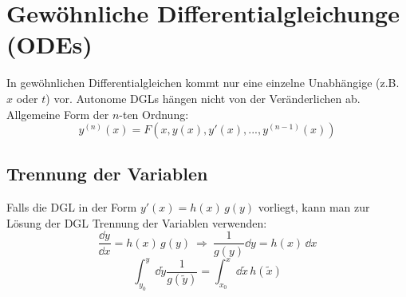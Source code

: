 \section{Gewöhnliche Differentialgleichunge (ODEs)}

In gewöhnlichen Differentialgleichen kommt nur eine einzelne Unabhängige (z.B. $x$ oder $t$) vor. Autonome DGLs hängen nicht von der Veränderlichen ab. Allgemeine Form der $n$-ten Ordnung:
\[
y^{(n)}(x) = F(x, y(x), y'(x), ..., y^{(n-1)}(x))
\]

\subsection{Trennung der Variablen}
\begin{framedprop}
Falls die DGL in der Form $y'(x) = h(x) \, g(y)$ vorliegt, kann man zur Lösung der DGL Trennung der Variablen verwenden:
\[
\frac{\dd y}{\dd x} = h(x) \, g(y) \ \Rightarrow \ \frac{1}{g(y)} \dd y = h(x) \, \dd x 
\]
\[
\int_{y_0}^{y} \dd \tilde{y} \frac{1}{g(\tilde{y})} = \int_{x_0}^{x} \dd \tilde{x} \, h(\tilde{x})
\]
\end{framedprop}

\newpage
